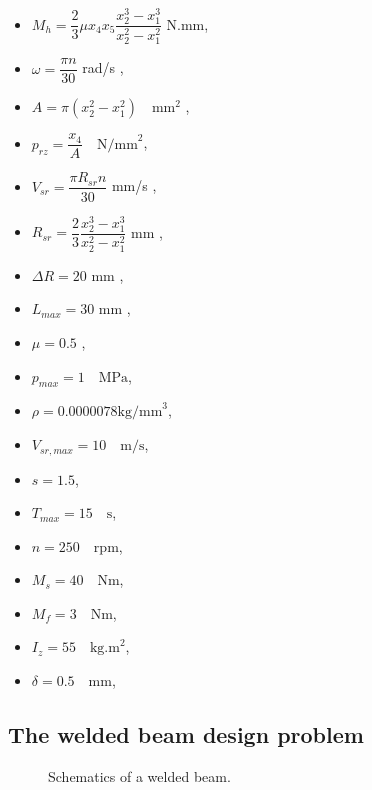 \begin{singlespacing}
\begin{flushleft}
\begin{itemize}
  \item $ M_h = \dfrac{2}{3} \mu x_4 x_5 \dfrac{x_{2}^3 - x_{1}^3}{x_2^2 - x_{1}^2} $ N.mm,
  \item $ \omega = \dfrac {\pi n}{30} $ rad/s ,
  \item $ A = \pi(x_2^2 - x_1^2) \quad \text{mm}^2$ ,
  \item $ p_{rz} = \dfrac{x_{4}}{A} \quad \text{N/mm}^2$,
  \item $ V_{sr} = \dfrac{\pi R_{sr} n} {30} $ mm/s ,
  \item $ R_{sr} = \dfrac{2}{3} \dfrac{x_{2}^3 - x_{1}^3}{x_2^2 - x_1^2} $ mm ,
  \item $ \Delta R = 20 $ mm ,
  \item $ L_{max} = 30 $ mm ,
  \item $ \mu = 0.5$ ,
  \item $p_{max} = 1 \quad \text{MPa}$, 
  \item $\rho = 0.0000078 \text{kg/mm}^3$,
  \item $V_{sr,max} = 10 \quad \text{m/s}$,
  \item $s = 1.5$,
  \item $T_{max} = 15 \quad \text{s}$, 
  \item $n = 250 \quad \text{rpm}$,
  \item $M_s = 40 \quad \text{Nm}$,
  \item $M_f = 3 \quad \text{Nm}$,
  \item $I_z = 55 \quad \text{kg.m}^2$,
  \item $\delta = 0.5 \quad \text{mm}$,
\end{itemize}

\end{flushleft}

\end{singlespacing}
    

\subsection{The welded beam design problem}



\begin{figure}[ht]\begin{center}
 \caption{Schematics of a welded beam.}
 \label{wbeam}
\end{center}\end{figure}


